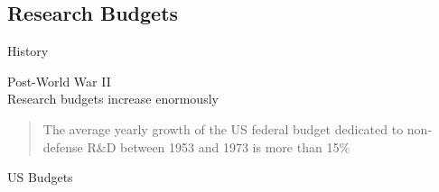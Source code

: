 \documentclass[10pt,compress,serif,aspectratio=169]{beamer}
\begin{document}

\subsection{Research Budgets}

\begin{frame}[t]{History}
{
 \begin{center}
   \Large Post-World War II\\ Research budgets increase enormously
 \end{center}
}
 \begin{quote}The average yearly growth of the US federal budget dedicated to non-defense R\&D between 1953 and 1973 is more than 15\%
 \end{quote}
\end{frame}

\begin{frame}[t]{US Budgets}
\end{frame}
\end{document}
